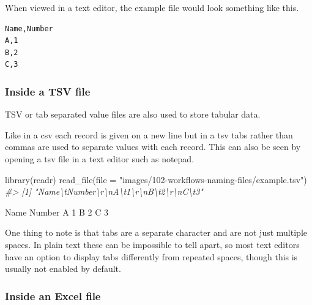 \documentclass[
  12pt,
]{book}
\newenvironment{Shaded}{\begin{snugshade}}{\end{snugshade}}
\newcommand{\AttributeTok}[1]{\textcolor[rgb]{0.77,0.63,0.00}{#1}}
\newcommand{\CommentTok}[1]{\textcolor[rgb]{0.56,0.35,0.01}{\textit{#1}}}
\newcommand{\FunctionTok}[1]{\textcolor[rgb]{0.00,0.00,0.00}{#1}}
\newcommand{\NormalTok}[1]{#1}
\newcommand{\StringTok}[1]{\textcolor[rgb]{0.31,0.60,0.02}{#1}}
\begin{document}
When viewed in a text editor, the example file would look something like this.

\begin{verbatim}
Name,Number 
A,1
B,2
C,3
\end{verbatim}

\hypertarget{inside-a-tsv-file}{%
\subsubsection{Inside a TSV file}\label{inside-a-tsv-file}}

TSV or tab separated value files are also used to store tabular data.

Like in a csv each record is given on a new line but in a tsv tabs rather than commas are used to separate values with each record. This can also be seen by opening a tsv file in a text editor such as notepad.

\begin{Shaded}
\begin{Highlighting}[]
\FunctionTok{library}\NormalTok{(readr)}
\FunctionTok{read\_file}\NormalTok{(}\AttributeTok{file =} \StringTok{"images/102{-}workflows{-}naming{-}files/example.tsv"}\NormalTok{)}
\CommentTok{\#\textgreater{} [1] "Name\textbackslash{}tNumber\textbackslash{}r\textbackslash{}nA\textbackslash{}t1\textbackslash{}r\textbackslash{}nB\textbackslash{}t2\textbackslash{}r\textbackslash{}nC\textbackslash{}t3"}
\end{Highlighting}
\end{Shaded}

\begin{Shaded}
\begin{Highlighting}[]
\NormalTok{Name    Number }
\NormalTok{A   1}
\NormalTok{B   2}
\NormalTok{C   3}
\end{Highlighting}
\end{Shaded}

One thing to note is that tabs are a separate character and are not just multiple spaces. In plain text these can be impossible to tell apart, so most text editors have an option to display tabs differently from repeated spaces, though this is usually not enabled by default.

\hypertarget{inside-an-excel-file}{%
\subsubsection{Inside an Excel file}\label{inside-an-excel-file}}
\end{document}
